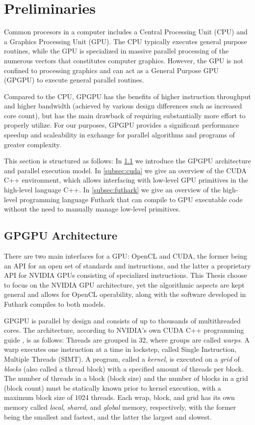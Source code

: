 \section{Preliminaries}
\label{sec:pre}
Common procesors in a computer includes a Central Processing Unit (CPU) and a
Graphics Processing Unit (GPU). The CPU typically executes general purpose
routines, while the GPU is specialized in massive parallel processing of the
numerous vectors that constitutes computer graphics. However, the GPU is not
confined to processing graphics and can act as a General Purpose GPU (GPGPU) to
execute general parallel routines.

Compared to the CPU, GPGPU has the benefits of higher instruction throughput and
higher bandwidth (achieved by various design differences such as increased core
count), but has the main drawback of requiring substantially more effort to
properly utilize. For our purposes, GPGPU provides a significant performance
speedup and scaleability in exchange for parallel algorithms and programs of
greater complexity.

This section is structured as follows: In \ref{subsec:gpgpu} we introduce the
GPGPU architecture and parallel execution model. In \ref{subsec:cuda} we give an
overview of the CUDA C++ environment, which allows interfacing with low-level
GPU primitives in the high-level language C++. In \ref{subsec:futhark} we give
an overview of the high-level programming language Futhark that can compile to
GPU executable code without the need to manually manage low-level primitives.

\subsection{GPGPU Architecture}
\label{subsec:gpgpu}

There are two main interfaces for a GPU: OpenCL and CUDA, the former being an
API for an open set of standards and instructions, and the latter a proprietary
API for NVIDIA GPUs consisting of specialized instructions. This Thesis choose
to focus on the NVIDIA GPU architecture, yet the algorithmic aspects are kept
general and allows for OpenCL operability, along with the software developed in
Futhark compiles to both models.

GPGPU is parallel by design and consists of up to thousands of multithreaded
cores. The architecture, according to NVIDIA's own CUDA C++ programming guide
\cite{cudaguide}, is as follows: Threads are grouped in 32, where groups are
called \textit{warps}. A warp executes one instruction at a time in lockstep,
called Single Instruction, Multiple Threads (SIMT). A program, called a
\textit{kernel}, is executed on a \textit{grid} of \textit{blocks} (also called
a thread block) with a specified amount of threads per block. The number of
threads in a block (block size) and the number of blocks in a grid (block count)
must be statically known prior to kernel execution, with a maximum block size of
1024 threads. Each wrap, block, and grid has its own memory called
\textit{local}, \textit{shared}, and \textit{global} memory, respectively, with
the former being the smallest and fastest, and the latter the largest and
slowest.

